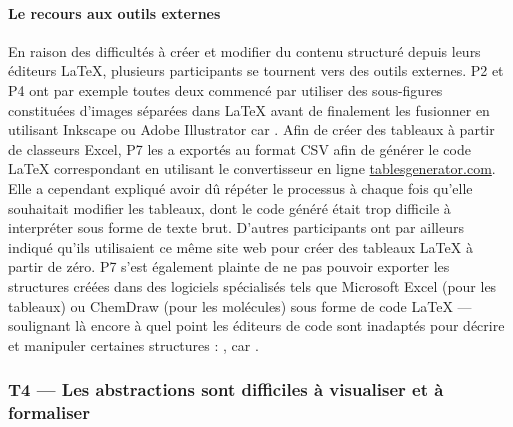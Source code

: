 \paragraph{Le recours aux outils externes}
En raison des difficultés à créer et modifier du contenu structuré depuis leurs éditeurs \LaTeX{}, plusieurs participants se tournent vers des outils externes.
P2 et P4 ont par exemple toutes deux commencé par utiliser des sous-figures constituées d'images séparées dans \LaTeX{} avant de finalement les fusionner en utilisant Inkscape ou Adobe Illustrator car .
Afin de créer des tableaux à partir de classeurs Excel, P7 les a exportés au format CSV afin de générer le code \LaTeX{} correspondant en utilisant le convertisseur en ligne \url{tablesgenerator.com}.
Elle a cependant expliqué avoir dû répéter le processus à chaque fois qu'elle souhaitait modifier les tableaux, dont le code généré était trop difficile à interpréter sous forme de texte brut.
D'autres participants ont par ailleurs indiqué qu'ils utilisaient ce même site web pour créer des tableaux \LaTeX{} à partir de zéro.
P7 s'est également plainte de ne pas pouvoir exporter les structures créées dans des logiciels spécialisés tels que Microsoft Excel (pour les tableaux) ou ChemDraw (pour les molécules) sous forme de code \LaTeX{} --- soulignant là encore à quel point les éditeurs de code sont inadaptés pour décrire et manipuler certaines structures :
, car .



\subsubsection{T4 --- Les abstractions sont difficiles à visualiser et à formaliser}

